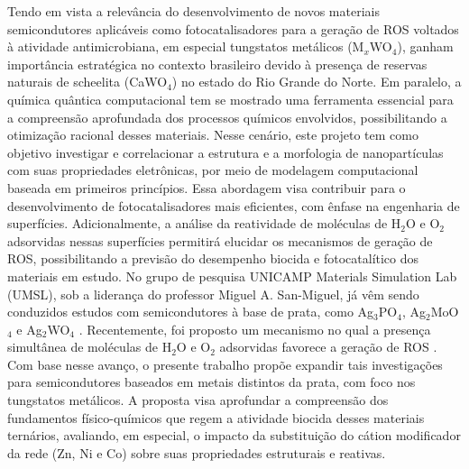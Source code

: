 Tendo em vista a relevância do desenvolvimento de novos materiais semicondutores aplicáveis como fotocatalisadores para a geração de ROS voltados à atividade antimicrobiana, em especial tungstatos metálicos (M$_x$WO$_4$), ganham importância estratégica no contexto brasileiro devido à presença de reservas naturais de scheelita (CaWO$_4$) no estado do Rio Grande do Norte. Em paralelo, a química quântica computacional tem se mostrado uma ferramenta essencial para a compreensão aprofundada dos processos químicos envolvidos, possibilitando a otimização racional desses materiais. Nesse cenário, este projeto tem como objetivo investigar e correlacionar a estrutura e a morfologia de nanopartículas com suas propriedades eletrônicas, por meio de modelagem computacional baseada em primeiros princípios. Essa abordagem visa contribuir para o desenvolvimento de fotocatalisadores mais eficientes, com ênfase na engenharia de superfícies. Adicionalmente, a análise da reatividade de moléculas de H$_2$O e O$_2$ adsorvidas nessas superfícies permitirá elucidar os mecanismos de geração de ROS, possibilitando a previsão do desempenho biocida e fotocatalítico dos materiais em estudo. No grupo de pesquisa UNICAMP Materials Simulation Lab (UMSL), sob a liderança do professor Miguel A. San-Miguel, já vêm sendo conduzidos estudos com semicondutores à base de prata, como Ag$_3$PO$_4$, Ag$_2$MoO$_4$ e Ag$_2$WO$_4$ \cite{gouveia2024whats,dorini2025mapping,roca2021selective}. Recentemente, foi proposto um mecanismo no qual a presença simultânea de moléculas de H$_2$O e O$_2$ adsorvidas favorece a geração de ROS \cite{lipsky2023tale}. Com base nesse avanço, o presente trabalho propõe expandir tais investigações para semicondutores baseados em metais distintos da prata, com foco nos tungstatos metálicos. A proposta visa aprofundar a compreensão dos fundamentos físico-químicos que regem a atividade biocida desses materiais ternários, avaliando, em especial, o impacto da substituição do cátion modificador da rede (Zn, Ni e Co) sobre suas propriedades estruturais e reativas.